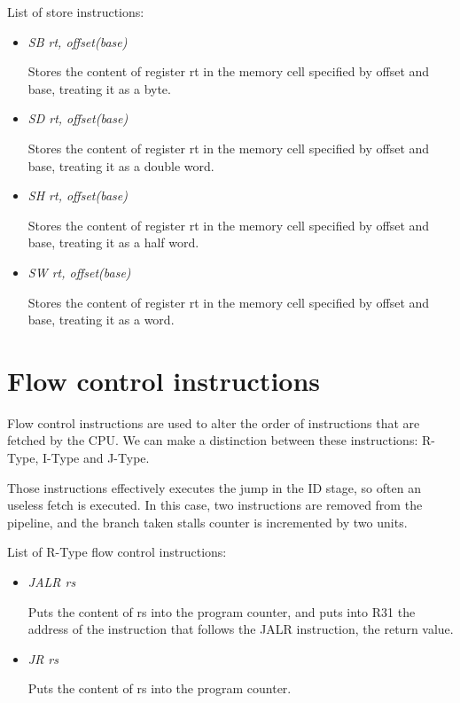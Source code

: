 \documentclass[letterpaper,10pt,english]{sphinxmanual}
\begin{document}
List of store instructions:
\begin{itemize}
\item {} 
\emph{SB rt, offset(base)}

Stores the content of register rt in the memory cell specified by offset and base, treating it as a byte.

\item {} 
\emph{SD rt, offset(base)}

Stores the content of register rt in the memory cell specified by offset and base, treating it as a double word.

\item {} 
\emph{SH rt, offset(base)}

Stores the content of register rt in the memory cell specified by offset and base, treating it as a half word.

\item {} 
\emph{SW rt, offset(base)}

Stores the content of register rt in the memory cell specified by offset and base, treating it as a word.

\end{itemize}


\section{Flow control instructions}
\label{instructions:flow-control-instructions}
Flow control instructions are used to alter the order of instructions that are
fetched by the CPU. We can make a distinction between these instructions:
R-Type, I-Type and J-Type.

Those instructions effectively executes the jump in the ID stage, so often an
useless fetch is executed. In this case, two instructions are removed from the
pipeline, and the branch taken stalls counter is incremented by two units.

List of R-Type flow control instructions:
\begin{itemize}
\item {} 
\emph{JALR rs}

Puts the content of rs into the program counter, and puts into R31 the address of the instruction that follows the JALR instruction, the return value.

\item {} 
\emph{JR rs}

Puts the content of rs into the program counter.

\end{itemize}
\end{document}
